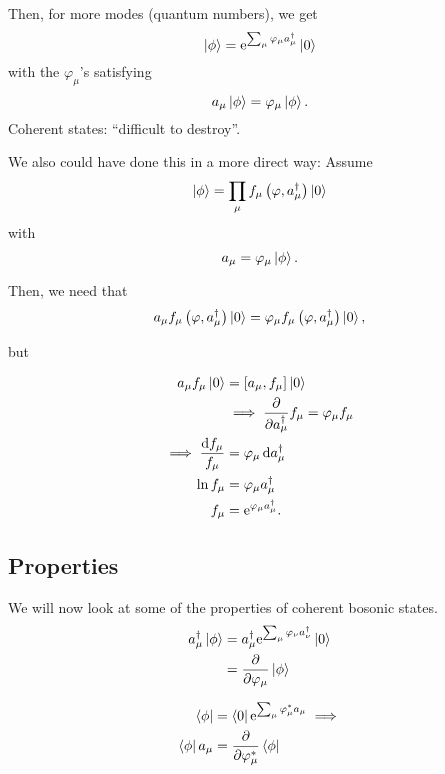 Then, for more modes (quantum numbers), we get
\begin{equation}
\ket{\phi} = \mathrm{e}^{\sum_\mu\varphi_\mu a_\mu^\dagger}\ket{0}
\end{equation}
with the $\varphi_\mu$'s satisfying
\begin{equation}
a_\mu\ket{\phi} = \varphi_\mu\ket{\phi}.
\end{equation}
Coherent states: ``difficult to destroy''.

We also could have done this in a more direct way:
Assume
\begin{equation}
\ket{\phi} = \prod_\mu f_\mu\left(\varphi, a_\mu^\dagger\right)\ket{0}
\end{equation}
with 
\begin{equation}
a_\mu =\varphi_\mu\ket{\phi}.
\end{equation}

Then, we need that 
\begin{equation}
a_\mu f_\mu\left(\varphi, a_\mu^\dagger\right)\ket{0} = \varphi_\mu f_\mu\left(\varphi, a_\mu^\dagger\right)\ket{0},
\end{equation}

but

\begin{align}
a_\mu f_\mu \ket{0} &= \comm{a_\mu}{f_\mu}\ket{0}\\
&\implies \pdv{a_\mu^\dagger} f_\mu = \varphi_\mu f_\mu \\
\implies \frac{\dd{f_\mu}}{{f_\mu}} &= \varphi_\mu \dd{a_\mu^\dagger} \\
\ln f_\mu &= \varphi_\mu a_\mu^\dagger \\
f_\mu &= \e^{\varphi_\mu a_\mu^\dagger}.
\end{align}

\subsection{Properties}
We will now look at some of the properties of coherent bosonic states. 
\begin{align}
a_\mu^\dagger\ket{\phi} &= a_\mu^\dagger\mathrm{e}^{\sum_\mu\varphi_\nu a_\nu^\dagger}\ket{0}\\
&= \pdv{\varphi_\mu}\ket{\phi}
\end{align}

\begin{align}
\bra{\phi} &= \bra{0}\mathrm{e}^{\sum_\mu \varphi_\mu^*a_\mu} \implies\\
\bra{\phi}a_\mu &= \pdv{\varphi_\mu^*}\bra{\phi}
\end{align}

